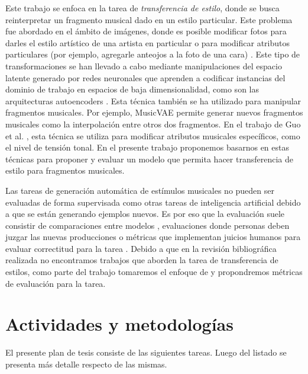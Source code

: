 \documentclass[10pt]{article}
\begin{document}
Este trabajo se enfoca en la tarea de \emph{transferencia de
estilo}, donde se busca reinterpretar un fragmento musical dado en un estilo
particular. Este problema fue abordado en el ámbito de imágenes, donde es
posible modificar fotos para darles el estilo artístico de una artista en
particular \cite{gatys2015style} o para modificar atributos particulares (por
ejemplo, agregarle anteojos a la foto de una cara) \cite{upchurch2016feature}.
Este tipo de transformaciones se han llevado a cabo mediante manipulaciones del
espacio latente generado por redes neuronales que aprenden a codificar
instancias del dominio de trabajo en espacios de baja dimensionalidad, como son
las arquitecturas autoencoders \cite{hou2016feature}. Esta técnica también se
ha utilizado para manipular fragmentos musicales. Por ejemplo, MusicVAE
\cite{roberts2019musicvae} permite generar nuevos fragmentos musicales como la
interpolación entre otros dos fragmentos. En el trabajo de Guo et al.
\cite{guo2020variational}, esta técnica se utiliza para modificar atributos
musicales específicos, como el nivel de tensión tonal. En el presente trabajo
proponemos basarnos en estas técnicas para proponer y evaluar un modelo que
permita hacer transferencia de estilo para fragmentos musicales.

Las tareas de generación automática de estímulos musicales no pueden ser
evaluadas de forma supervisada como otras tareas de inteligencia artificial
debido a que se están generando ejemplos nuevos. Es por eso que la evaluación
suele consistir de comparaciones entre modelos \cite{Berardinis}, evaluaciones
donde personas deben juzgar las nuevas producciones \cite{hadjeres2017bach} o
métricas que implementan juicios humanos para evaluar correctitud para la
tarea \cite{benetatos2020bachduet}. Debido a que en la revisión bibliográfica 
realizada no encontramos trabajos que aborden la tarea de transferencia de
estilos, como parte del trabajo tomaremos el enfoque de
\cite{benetatos2020bachduet} y propondremos métricas de evaluación para la
tarea.

\section*{Actividades y metodologías}
El presente plan de tesis consiste de las siguientes tareas. Luego del listado
se presenta más detalle respecto de las mismas.
\end{document}
